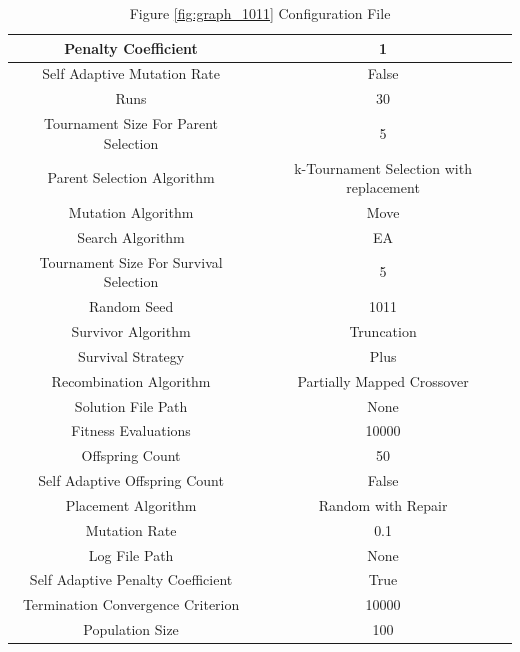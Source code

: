 \documentclass{standalone}
\begin{document}
\begin{table}[!htb]
	\centering
	\caption{Figure \ref{fig:graph_1011} Configuration File}
	\label{tab:graph_1011}
	\begin{tabular}{| c | c |}
		\hline
		Penalty Coefficient		& 1		 \\
		\hline
		Self Adaptive Mutation Rate		& False		 \\
		\hline
		Runs		& 30		 \\
		\hline
		Tournament Size For Parent Selection		& 5		 \\
		\hline
		Parent Selection Algorithm		& k-Tournament Selection with replacement		 \\
		\hline
		Mutation Algorithm		& Move		 \\
		\hline
		Search Algorithm		& EA		 \\
		\hline
		Tournament Size For Survival Selection		& 5		 \\
		\hline
		Random Seed		& 1011		 \\
		\hline
		Survivor Algorithm		& Truncation		 \\
		\hline
		Survival Strategy		& Plus		 \\
		\hline
		Recombination Algorithm		& Partially Mapped Crossover		 \\
		\hline
		Solution File Path		& None		 \\
		\hline
		Fitness Evaluations		& 10000		 \\
		\hline
		Offspring Count		& 50		 \\
		\hline
		Self Adaptive Offspring Count		& False		 \\
		\hline
		Placement Algorithm		& Random with Repair		 \\
		\hline
		Mutation Rate		& 0.1		 \\
		\hline
		Log File Path		& None		 \\
		\hline
		Self Adaptive Penalty Coefficient		& True		 \\
		\hline
		Termination Convergence Criterion		& 10000		 \\
		\hline
		Population Size		& 100		 \\
		\hline
	\end{tabular}
\end{table}
\end{document}
